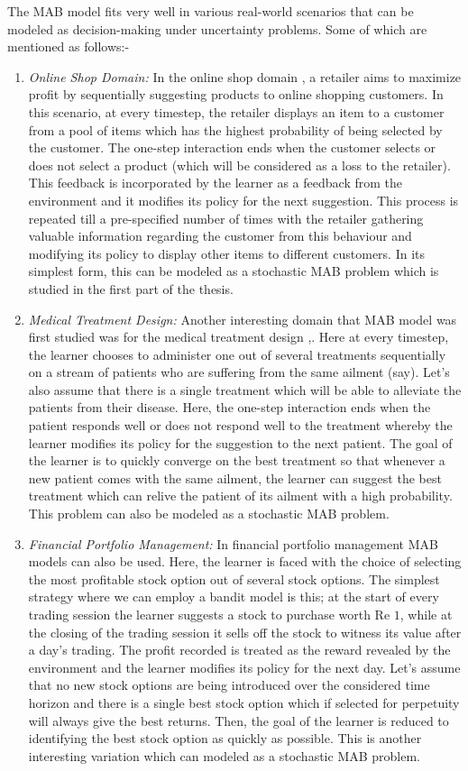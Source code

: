 
The MAB model fits very well in various real-world scenarios that can be modeled as decision-making under uncertainty  problems. Some of which are mentioned as follows:-
\begin{enumerate}
\item \emph{Online Shop Domain:} In the online shop domain \citep{ghavamzadeh2015bayesian}, a retailer aims to maximize profit by sequentially suggesting products to online shopping customers. In this scenario, at every timestep, the retailer displays an item to a customer from a pool of items which has the highest probability of being selected by the customer. The one-step interaction ends when the customer selects or does not select a product (which will be considered as a loss to the retailer). This feedback is incorporated by the learner as a feedback from the environment and it modifies its policy for the next suggestion. This process is repeated till a pre-specified number of times with the retailer gathering valuable information regarding the customer from this behaviour and modifying its policy to display other items to different customers. In its simplest form,  this can be modeled as a stochastic MAB problem which is studied in the first part of the thesis.
\item \emph{Medical Treatment Design:} Another interesting domain that MAB model was first studied was for the medical treatment design \citep{thompson1933likelihood},\citep{thompson1935theory}. Here at every timestep, the learner chooses to administer one out of several treatments sequentially on a stream of patients who are suffering from the same ailment (say). Let's also assume that there is a single treatment which will be able to alleviate the patients from their disease. Here, the  one-step interaction ends when the patient responds well or does not respond well to the treatment whereby the learner modifies its policy for the suggestion to the next patient. The goal of the learner is to quickly converge on the best treatment so that whenever a new patient comes with the same ailment, the learner can suggest the best treatment which can relive the patient of its ailment with a high probability. This problem can also be modeled as a stochastic MAB problem.
\item \emph{Financial Portfolio Management:} In financial portfolio management MAB models can also be used. Here, the learner is faced with the choice of selecting the most profitable stock option out of several stock options. The simplest strategy where we can employ a bandit model is this; at the start of every trading session the learner suggests a stock to purchase worth Re $1$, while at the closing of the trading session it sells off the stock to witness its value after a day's trading. The  profit recorded is treated as the reward revealed by the environment and the learner modifies its policy for the next day. Let's assume that no new stock options are being introduced over the considered time horizon and there is a single best stock option which if selected for perpetuity will always give the best returns. Then, the goal of the learner is reduced to identifying the best stock option as quickly as possible. This is another interesting variation which can modeled as a stochastic MAB problem.

\end{enumerate}

